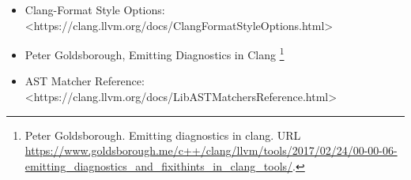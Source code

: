 \begin{itemize}
\item
Clang-Format Style Options: <https://clang.llvm.org/docs/ClangFormatStyleOptions.html>

\item
Peter Goldsborough, Emitting Diagnostics in Clang \footnote{Peter Goldsborough. Emitting diagnostics in clang. URL \url{https://www.goldsborough.me/c++/clang/llvm/tools/2017/02/24/00-00-06-emitting_diagnostics_and_fixithints_in_clang_tools/}.}

\item
AST Matcher Reference: <https://clang.llvm.org/docs/LibASTMatchersReference.html>
\end{itemize}